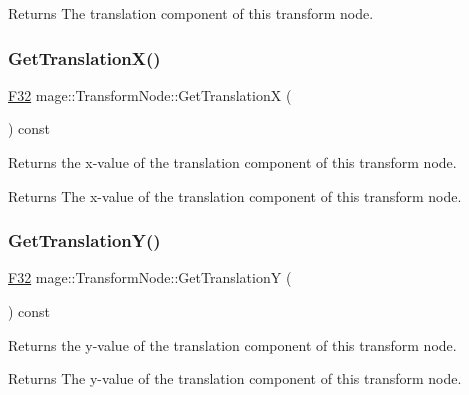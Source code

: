 \begin{DoxyReturn}{Returns}
The translation component of this transform node. 
\end{DoxyReturn}
\hypertarget{classmage_1_1_transform_node_a62d6ef7ab4fb3b9e550990655655ed5b}{}\label{classmage_1_1_transform_node_a62d6ef7ab4fb3b9e550990655655ed5b} 
\subsubsection{\texorpdfstring{Get\+Translation\+X()}{GetTranslationX()}}
{\footnotesize\ttfamily \hyperlink{namespacemage_aa97e833b45f06d60a0a9c4fc22ae02c0}{F32} mage\+::\+Transform\+Node\+::\+Get\+TranslationX (\begin{DoxyParamCaption}{ }\end{DoxyParamCaption}) const\hspace{0.3cm}{\ttfamily [noexcept]}}

Returns the x-\/value of the translation component of this transform node.

\begin{DoxyReturn}{Returns}
The x-\/value of the translation component of this transform node. 
\end{DoxyReturn}
\hypertarget{classmage_1_1_transform_node_aedabfc6152a5ad5775cbb10fec790b07}{}\label{classmage_1_1_transform_node_aedabfc6152a5ad5775cbb10fec790b07} 
\subsubsection{\texorpdfstring{Get\+Translation\+Y()}{GetTranslationY()}}
{\footnotesize\ttfamily \hyperlink{namespacemage_aa97e833b45f06d60a0a9c4fc22ae02c0}{F32} mage\+::\+Transform\+Node\+::\+Get\+TranslationY (\begin{DoxyParamCaption}{ }\end{DoxyParamCaption}) const\hspace{0.3cm}{\ttfamily [noexcept]}}

Returns the y-\/value of the translation component of this transform node.

\begin{DoxyReturn}{Returns}
The y-\/value of the translation component of this transform node. 
\end{DoxyReturn}
\hypertarget{classmage_1_1_transform_node_a2c34908570c0d84f9312462a0cc255c7}{}\label{classmage_1_1_transform_node_a2c34908570c0d84f9312462a0cc255c7} 
